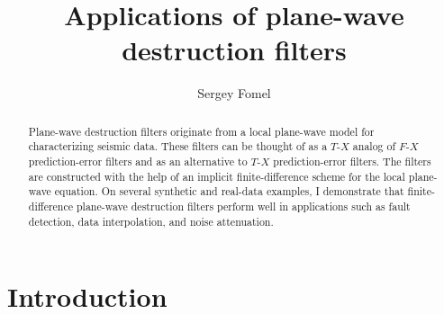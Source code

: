 


\title{Applications of plane-wave destruction filters}


\author{Sergey Fomel}

\maketitle

\begin{abstract}
  Plane-wave destruction filters originate from a local plane-wave
  model for characterizing seismic data. These filters can be thought
  of as a $T$-$X$ analog of $F$-$X$ prediction-error filters and as an
  alternative to $T$-$X$ prediction-error filters. The filters are
  constructed with the help of an implicit finite-difference scheme
  for the local plane-wave equation.  On several synthetic and
  real-data examples, I demonstrate that finite-difference plane-wave
  destruction filters perform well in applications such as fault
  detection, data interpolation, and noise attenuation.
\end{abstract}

\section{Introduction}

